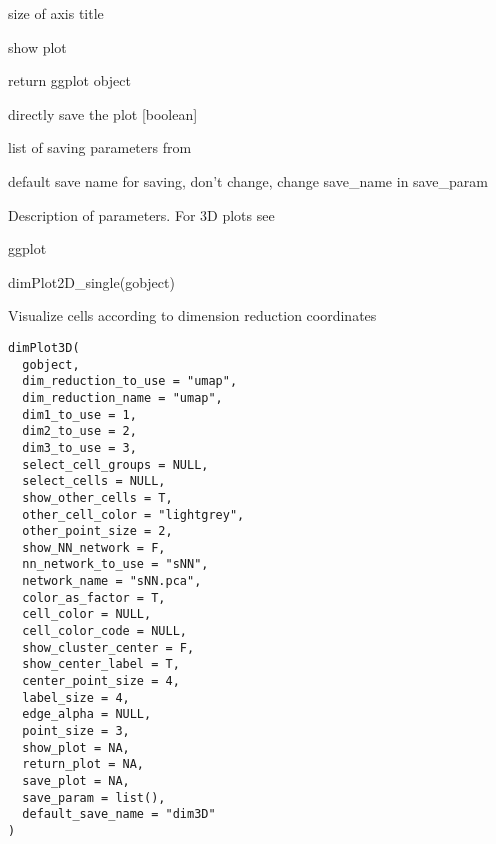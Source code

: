 \documentclass[a4paper]{book}
\begin{document}
\begin{Arguments}
\begin{ldescription}
\item[\code{axis\_title}] size of axis title

\item[\code{show\_plot}] show plot

\item[\code{return\_plot}] return ggplot object

\item[\code{save\_plot}] directly save the plot [boolean]

\item[\code{save\_param}] list of saving parameters from 

\item[\code{default\_save\_name}] default save name for saving, don't change, change save\_name in save\_param
\end{ldescription}
\end{Arguments}
%
\begin{Details}\relax
Description of parameters. For 3D plots see 
\end{Details}
%
\begin{Value}
ggplot
\end{Value}
%
\begin{Examples}
\begin{ExampleCode}
    dimPlot2D_single(gobject)
\end{ExampleCode}
\end{Examples}
%
\begin{Description}\relax
Visualize cells according to dimension reduction coordinates
\end{Description}
%
\begin{Usage}
\begin{verbatim}
dimPlot3D(
  gobject,
  dim_reduction_to_use = "umap",
  dim_reduction_name = "umap",
  dim1_to_use = 1,
  dim2_to_use = 2,
  dim3_to_use = 3,
  select_cell_groups = NULL,
  select_cells = NULL,
  show_other_cells = T,
  other_cell_color = "lightgrey",
  other_point_size = 2,
  show_NN_network = F,
  nn_network_to_use = "sNN",
  network_name = "sNN.pca",
  color_as_factor = T,
  cell_color = NULL,
  cell_color_code = NULL,
  show_cluster_center = F,
  show_center_label = T,
  center_point_size = 4,
  label_size = 4,
  edge_alpha = NULL,
  point_size = 3,
  show_plot = NA,
  return_plot = NA,
  save_plot = NA,
  save_param = list(),
  default_save_name = "dim3D"
)
\end{verbatim}
\end{Usage}
\end{document}
